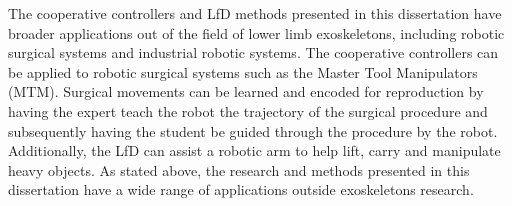 The cooperative controllers and LfD methods presented in this dissertation have broader applications out of the field of lower limb exoskeletons, including robotic surgical systems and industrial robotic systems. The cooperative controllers can be applied to robotic surgical systems such as the Master Tool Manipulators (MTM). Surgical movements can be learned and encoded for reproduction by having the expert teach the robot the trajectory of the surgical procedure and subsequently having the student be guided through the procedure by the robot. Additionally, the LfD can assist a robotic arm to help lift, carry and manipulate heavy objects. As stated above, the research and methods presented in this dissertation have a wide range of applications outside exoskeletons research.  








   